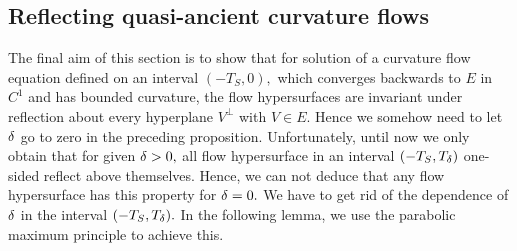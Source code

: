 \documentclass{amsart}
\begin{document}
\subsection{Reflecting quasi-ancient curvature flows}

The final aim of this section is to show that for solution of a curvature flow equation defined on an interval $(-T_{S},0),$ which converges backwards to $E$ in $C^{1}$ and has bounded curvature, the flow hypersurfaces are invariant under reflection about every hyperplane $V^{\perp}$ with $V\in E.$ Hence we somehow need to let $\delta$ go to zero in the preceding proposition. Unfortunately, until now we only obtain that for given $\delta>0,$ all flow hypersurface in an interval $(-T_{S},T_{\delta})$ one-sided reflect above themselves. Hence, we can not deduce that any flow hypersurface has this property for $\delta=0.$ We have to get rid of the dependence of $\delta$ in the interval $(-T_{S},T_{\delta}).$ In the following lemma, we use the parabolic maximum principle to achieve this.

\end{document}
